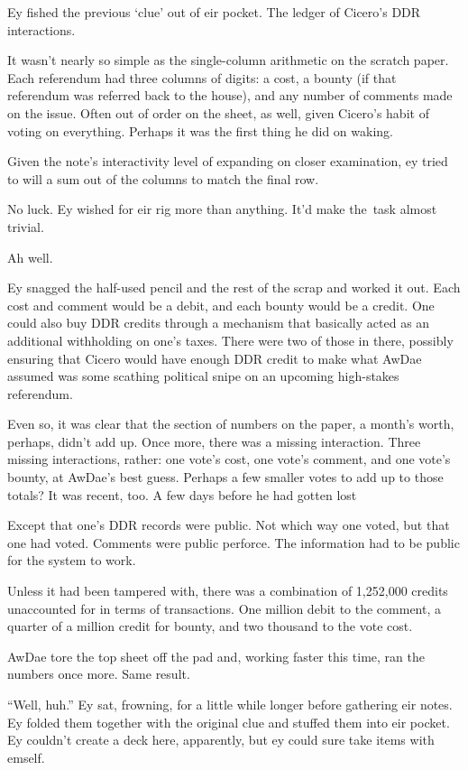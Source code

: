 Ey fished the previous `clue' out of eir pocket. The ledger of Cicero's DDR interactions.

It wasn't nearly so simple as the single-column arithmetic on the scratch paper. Each referendum had three columns of digits: a cost, a bounty (if that referendum was referred back to the house), and any number of comments made on the issue. Often out of order on the sheet, as well, given Cicero's habit of voting on everything. Perhaps it was the first thing he did on waking.

Given the note's interactivity level of expanding on closer examination, ey tried to will a sum out of the columns to match the final row.

No luck. Ey wished for eir rig more than anything. It'd make the\pagebreak\ task almost trivial.

Ah well.

Ey snagged the half-used pencil and the rest of the scrap and worked it out. Each cost and comment would be a debit, and each bounty would be a credit. One could also buy DDR credits through a mechanism that basically acted as an additional withholding on one's taxes. There were two of those in there, possibly ensuring that Cicero would have enough DDR credit to make what AwDae assumed was some scathing political snipe on an upcoming high-stakes referendum.

Even so, it was clear that the section of numbers on the paper, a month's worth, perhaps, didn't add up. Once more, there was a missing interaction. Three missing interactions, rather: one vote's cost, one vote's comment, and one vote's bounty, at AwDae's best guess. Perhaps a few smaller votes to add up to those totals? It was recent, too. A few days before he had gotten lost

Except that one's DDR records were public. Not which way one voted, but that one had voted. Comments were public perforce. The information had to be public for the system to work.

Unless it had been tampered with, there was a combination of 1,252,000 credits unaccounted for in terms of transactions. One million debit to the comment, a quarter of a million credit for bounty, and two thousand to the vote cost.

AwDae tore the top sheet off the pad and, working faster this time, ran the numbers once more. Same result.

``Well, huh.'' Ey sat, frowning, for a little while longer before gathering eir notes. Ey folded them together with the original clue and stuffed them into eir pocket. Ey couldn't create a deck here, apparently, but ey could sure take items with emself.

